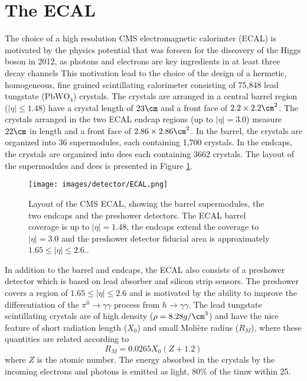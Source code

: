 \section{The ECAL}
\noindent\justify
The choice of a high resolution CMS electromagnetic calorimter (ECAL) is motivated by the physics potential that was forseen for the discovery of the Higgs boson in 2012, as photons and electrons are key ingredients in at least three decay channels \cite{Cockerill:2008td}
This motivation lead to the choice of the design of a hermetic, homogeneous, fine grained scintillating calorimeter consisting of 75,848 lead tungstate ($\mathrm{PbWO_{4}}$) crystals. 
The crystals are arranged in a central barrel region ($|\eta|\leq1.48$) have a crystal length of $23\cm$ and a front face of $2.2\times2.2\cm^{2}$. 
The crystals arranged in the two ECAL endcap regions (up to $|\eta|=3.0$) measure $22\cm$ in length and a front face of $2.86\times2.86\cm^{2}$. 
In the barrel, the crystals are organized into 36 supermodules, each containing 1,700 crystals. 
In the endcaps, the crystals are organized into dees each containing 3662 crystals. 
The layout of the supermodules and dees is presented in Figure \ref{fig:ECAL}. 
\begin{figure}[!htp]
  \centering
   \texttt{[image: images/detector/ECAL.png]}
   \caption{Layout of the CMS ECAL, showing the barrel supermodules, the two endcaps and the preshower detectors. The ECAL barrel coverage is up to $|\eta|=1.48$, the endcaps extend the coverage to $|\eta|=3.0$ and the preshower detector fiducial area is approximately $1.65\leq|\eta|\leq2.6$.\cite{Chatrchyan:2013dga}.}
   \label{fig:ECAL}
\end{figure}                                                                                            
In addition to the barrel and endcaps, the ECAL also consists of a preshower detector which is based on lead absorber and silicon strip sensors. 
The preshower covers a region of $1.65\leq|\eta|\leq2.6$ and is motivated by the ability to improve the differentiation of the $\pi^{0}\rightarrow\gamma\gamma$ process from $h\rightarrow\gamma\gamma$. 
The lead tungstate scintillating crystals are of high density ($\rho=8.28g/\cm^{3}$) and have the nice feature of short radiation length ($X_{0}$) and small Moli\`ere radius ($R_{M}$), where these quantities are related according to
\begin{equation}
R_{M} = 0.0265 X_{0}(Z+1.2)
\end{equation}
where $Z$ is the atomic number.
The energy absorbed in the crystals by the incoming electrons and photons is emitted as light, 80\% of the timw within 25\ns. 
